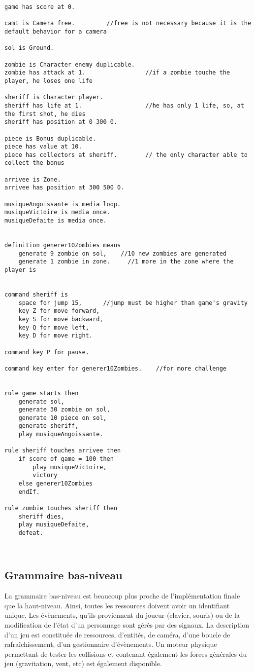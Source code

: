 \begin{lstlisting}[language=GameGrammar]
game has score at 0.

cam1 is Camera free.         //free is not necessary because it is the default behavior for a camera

sol is Ground.

zombie is Character enemy duplicable. 
zombie has attack at 1.                 //if a zombie touche the player, he loses one life

sheriff is Character player.
sheriff has life at 1.                  //he has only 1 life, so, at the first shot, he dies
sheriff has position at 0 300 0.

piece is Bonus duplicable.
piece has value at 10.
piece has collectors at sheriff.        // the only character able to collect the bonus

arrivee is Zone.
arrivee has position at 300 500 0.

musiqueAngoissante is media loop.
musiqueVictoire is media once.
musiqueDefaite is media once.


definition generer10Zombies means
	generate 9 zombie on sol,    //10 new zombies are generated
	generate 1 zombie in zone.     //1 more in the zone where the player is


command sheriff is 
	space for jump 15,      //jump must be higher than game's gravity
	key Z for move forward, 
	key S for move backward, 
	key Q for move left,
	key D for move right.

command key P for pause.

command key enter for generer10Zombies.    //for more challenge


rule game starts then 
	generate sol,
	generate 30 zombie on sol,
	generate 10 piece on sol,
	generate sheriff,
	play musiqueAngoissante.

rule sheriff touches arrivee then 
	if score of game = 100 then 
		play musiqueVictoire,
		victory
	else generer10Zombies
	endIf.

rule zombie touches sheriff then 
	sheriff dies,
	play musiqueDefaite,
	defeat.



\end{lstlisting}

\subsection{Grammaire bas-niveau}

La grammaire bas-niveau est beaucoup plus proche de l'implémentation finale que la haut-niveau.
Ainsi, toutes les ressources doivent avoir un identifiant unique. Les évènements, qu'ils proviennent du joueur (clavier, souris) ou de la modification
de l'état d'un personnage sont gérés par des signaux.
La description d'un jeu est constituée de ressources, d'entités, de caméra, d'une boucle de rafraîchissement, d'un gestionnaire d'évènements.
Un moteur physique permettant de tester les collisions et contenant également les forces générales du jeu (gravitation, vent, etc) est également disponible.

